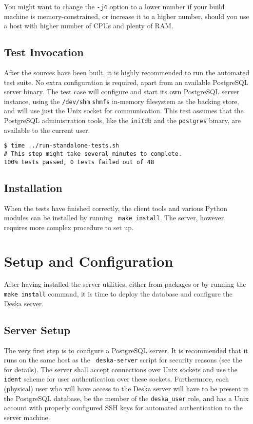 \documentclass[deska]{subfiles}
\begin{document}
You might want to change the {\tt -j4} option to a lower number if your build machine is memory-constrained, or increase
it to a higher number, should you use a host with higher number of CPUs and plenty of RAM.

\subsection{Test Invocation}

After the sources have been built, it is highly recommended to run the automated test suite.  No extra configuration is
required, apart from an available PostgreSQL server binary.  The test case will configure and start its own PostgreSQL
server instance, using the {\tt /dev/shm} {\tt shmfs} in-memory filesystem as the backing store, and will use just the
Unix socket for communication.  This test assumes that the PostgreSQL administration tools, like the {\tt initdb} and
the {\tt postgres} binary, are available to the current user.

\begin{verbatim}
$ time ../run-standalone-tests.sh
# This step might take several minutes to complete.
100% tests passed, 0 tests failed out of 48
\end{verbatim}

\subsection{Installation}

When the tests have finished correctly, the client tools and various Python modules can be installed by running {\tt
make install}.  The server, however, requires more complex procedure to set up.

\section{Setup and Configuration}
\label{sec:build-server-setup}

After having installed the server utilities, either from packages or by running the {\tt make install} command, it is
time to deploy the database and configure the Deska server.

\subsection{Server Setup}

The very first step is to configure a PostgreSQL server.  It is recommended that it runs on the same host as the {\tt
deska-server} script for security reasons (see the  for details).  The server shall
accept connections over Unix sockets and use the {\tt ident} scheme for user authentication over these sockets.
Furthermore, each (physical) user who will have access to the Deska server will have to be present in the PostgreSQL
database, be the member of the {\tt deska\_user} role, and has a Unix account with properly configured SSH keys for
automated authentication to the server machine.
\end{document}
